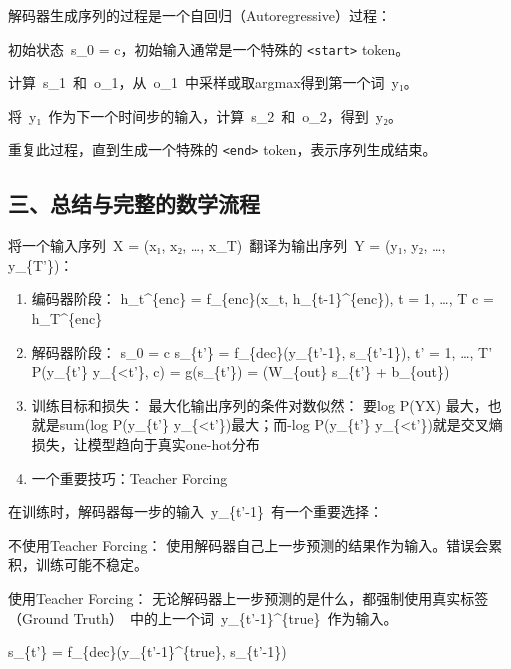 解码器生成序列的过程是一个自回归（Autoregressive）过程：

初始状态~s\_0 = c，初始输入通常是一个特殊的 \texttt{\textless{}start\textgreater{}} token。

计算~s\_1~和~o\_1，从~o\_1~中采样或取argmax得到第一个词~y₁。

将~y₁~作为下一个时间步的输入，计算~s\_2~和~o\_2，得到~y₂。

重复此过程，直到生成一个特殊的 \texttt{\textless{}end\textgreater{}} token，表示序列生成结束。

\hypertarget{ux4e09ux603bux7ed3ux4e0eux5b8cux6574ux7684ux6570ux5b66ux6d41ux7a0b}{%
\subsection{三、总结与完整的数学流程}\label{ux4e09ux603bux7ed3ux4e0eux5b8cux6574ux7684ux6570ux5b66ux6d41ux7a0b}}

将一个输入序列~X = (x₁, x₂, \ldots, x\_T)~翻译为输出序列~Y = (y₁, y₂, \ldots, y\_\{T'\})：

\begin{enumerate}
\def\labelenumi{\arabic{enumi}.}
\item
  编码器阶段：
  h\_t\^{}\{enc\} = f\_\{enc\}(x\_t, h\_\{t-1\}\^{}\{enc\}), \quad {} t = 1, \ldots, T
  c = h\_T\^{}\{enc\}
\item
  解码器阶段：
  s\_0 = c
  s\_\{t'\} = f\_\{dec\}(y\_\{t'-1\}, s\_\{t'-1\}), \quad {} t' = 1, \ldots, T'
  P(y\_\{t'\} \textbar{} y\_\{\textless t'\}, c) = g(s\_\{t'\}) = (W\_\{out\} s\_\{t'\} + b\_\{out\})
\item
  训练目标和损失：
  最大化输出序列的条件对数似然：
  要log P(Y\textbar X) 最大，也就是sum(log P(y\_\{t'\} \textbar{} y\_\{\textless t'\})最大；而-log P(y\_\{t'\} \textbar{} y\_\{\textless t'\})就是交叉熵损失，让模型趋向于真实one-hot分布
\item
  一个重要技巧：Teacher Forcing
\end{enumerate}

在训练时，解码器每一步的输入~y\_\{t'-1\}~有一个重要选择：

不使用Teacher Forcing： 使用解码器自己上一步预测的结果作为输入。错误会累积，训练可能不稳定。

使用Teacher Forcing： 无论解码器上一步预测的是什么，都强制使用真实标签（Ground Truth）~中的上一个词~y\_\{t'-1\}\^{}\{true\}~作为输入。

s\_\{t'\} = f\_\{dec\}(y\_\{t'-1\}\^{}\{true\}, s\_\{t'-1\})

